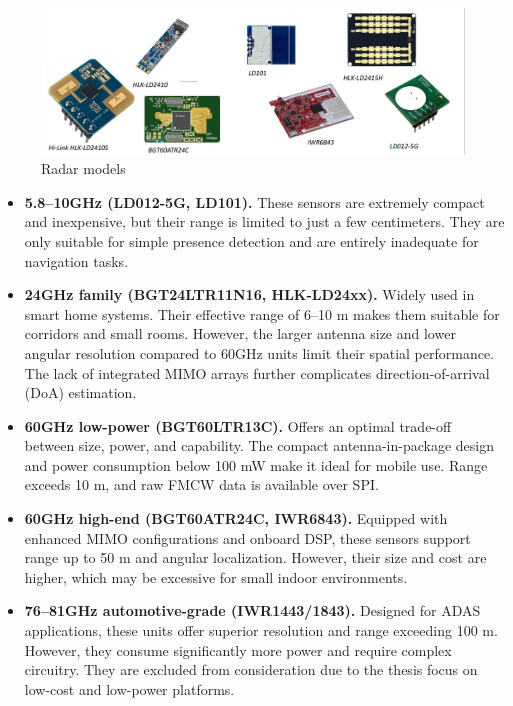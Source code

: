 \begin{figure}
    \centering
    \includegraphics[width=0.8\linewidth]{Src/images/Radarmodels.png}
    \caption{Radar models}
    \label{fig:Radarmodels}
\end{figure}
\begin{itemize}
\item \textbf{5.8–10\;GHz (LD012-5G, LD101).} These sensors are extremely compact and inexpensive, but their range is limited to just a few centimeters. They are only suitable for simple presence detection and are entirely inadequate for navigation tasks.
  
\item \textbf{24\;GHz family (BGT24LTR11N16, HLK-LD24xx).} Widely used in smart home systems. Their effective range of 6–10 m makes them suitable for corridors and small rooms. However, the larger antenna size and lower angular resolution compared to 60\;GHz units limit their spatial performance. The lack of integrated MIMO arrays further complicates direction-of-arrival (DoA) estimation.

\item \textbf{60\;GHz low-power (BGT60LTR13C).} Offers an optimal trade-off between size, power, and capability. The compact antenna-in-package design and power consumption below 100 mW make it ideal for mobile use. Range exceeds 10 m, and raw FMCW data is available over SPI. 

\item \textbf{60\;GHz high-end (BGT60ATR24C, IWR6843).} Equipped with enhanced MIMO configurations and onboard DSP, these sensors support range up to 50 m and angular localization. However, their size and cost are higher, which may be excessive for small indoor environments.

\item \textbf{76–81\;GHz automotive-grade (IWR1443/1843).} Designed for ADAS applications, these units offer superior resolution and range exceeding 100 m. However, they consume significantly more power and require complex circuitry. They are excluded from consideration due to the thesis focus on low-cost and low-power platforms.
\end{itemize}

